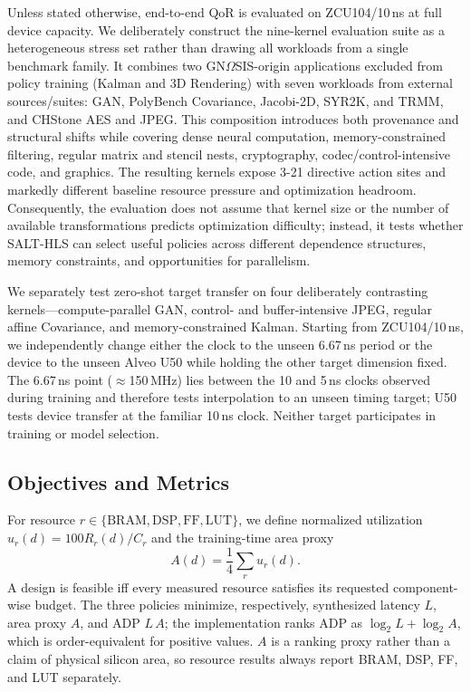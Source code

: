Unless stated otherwise, end-to-end QoR is evaluated on ZCU104/10\,ns at full device capacity. We deliberately construct the nine-kernel evaluation suite as a heterogeneous stress set rather than drawing all workloads from a single benchmark family. It combines two GN$\Omega$SIS-origin applications excluded from policy training (Kalman and 3D Rendering) with seven workloads from external sources/suites: GAN, PolyBench Covariance, Jacobi-2D, SYR2K, and TRMM, and CHStone AES and JPEG. This composition introduces both provenance and structural shifts while covering dense neural computation, memory-constrained filtering, regular matrix and stencil
nests, cryptography, codec/control-intensive code, and graphics.
The resulting kernels expose 3-21 directive action sites and markedly different baseline resource pressure and optimization headroom.
Consequently, the evaluation does not assume that kernel size or the number of available transformations predicts optimization difficulty;
instead, it tests whether SALT-HLS can select useful policies across different dependence structures, memory constraints, and opportunities for parallelism.

We separately test zero-shot target transfer on four deliberately
contrasting kernels---compute-parallel GAN, control- and buffer-intensive JPEG, regular affine Covariance, and memory-constrained Kalman.
Starting from ZCU104/10\,ns, we independently change either the clock to the unseen 6.67\,ns period or the device to the unseen Alveo U50 while holding the other target dimension fixed. The 6.67\,ns point ($\approx$150\,MHz) lies between the 10 and 5\,ns clocks observed during training and therefore tests interpolation to an unseen timing target;
U50 tests device transfer at the familiar 10\,ns clock. Neither target participates in training or model selection.


\subsection{Objectives and Metrics}
\label{subsec:eval-objectives}
\label{subsec:eval-metrics}

For resource $r\in\{\mathrm{BRAM},\mathrm{DSP},\mathrm{FF},\mathrm{LUT}\}$,
we define normalized utilization
$u_r(d)=100R_r(d)/C_r$ and the training-time area proxy
%
\[
A(d)=\frac{1}{4}\sum_r u_r(d).
\]
%
A design is feasible iff every measured resource satisfies its
requested component-wise budget. The three policies minimize,
respectively, synthesized latency $L$, area proxy $A$, and
ADP $L\,A$; the implementation ranks ADP as
$\log_2 L+\log_2 A$, which is order-equivalent for positive values.
$A$ is a ranking proxy rather than a claim of physical silicon area,
so resource results always report BRAM, DSP, FF, and LUT separately.

